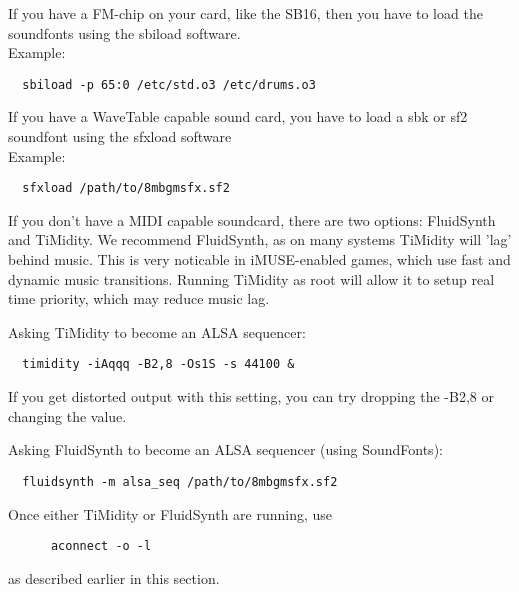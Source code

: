 If you have a FM-chip on your card, like the SB16, then you have to load
the soundfonts using the sbiload software. \\
Example:
\begin{verbatim}
  sbiload -p 65:0 /etc/std.o3 /etc/drums.o3
\end{verbatim}
%
If you have a WaveTable capable sound card, you have to load a sbk or sf2
soundfont using the sfxload software\\
Example:
\begin{verbatim}
  sfxload /path/to/8mbgmsfx.sf2
\end{verbatim}
%
If you don't have a MIDI capable soundcard, there are two options: FluidSynth
and TiMidity. We recommend FluidSynth, as on many systems TiMidity will 'lag'
behind music. This is very noticable in iMUSE-enabled games, which use fast
and dynamic music transitions. Running TiMidity as root will allow it to
setup real time priority, which may reduce music lag.

Asking TiMidity to become an ALSA sequencer:
\begin{verbatim}
  timidity -iAqqq -B2,8 -Os1S -s 44100 &
\end{verbatim}
If you get distorted output with this setting, you can try dropping the 
-B2,8 or changing the value.

Asking FluidSynth to become an ALSA sequencer (using SoundFonts):
\begin{verbatim}
  fluidsynth -m alsa_seq /path/to/8mbgmsfx.sf2
\end{verbatim}
%
Once either TiMidity or FluidSynth are running, use
\begin{verbatim}
      aconnect -o -l
\end{verbatim}
as described earlier in this section.